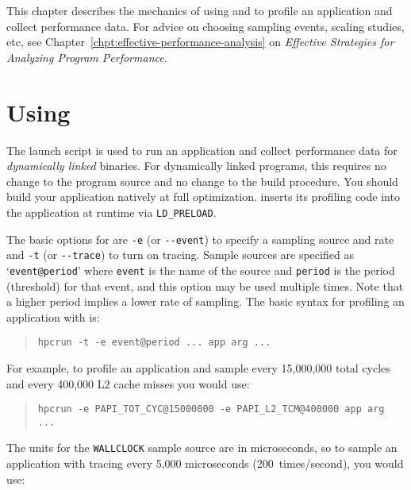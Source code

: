 
This chapter describes the mechanics of using \hpcrun{} and \hpclink{}
to profile an application and collect performance data.  For advice on
choosing sampling events, scaling studies, etc, see
Chapter~\ref{chpt:effective-performance-analysis} on {\it Effective
Strategies for Analyzing Program Performance}.

\section{Using \hpcrun{}}

The \hpcrun{} launch script is used to run an application and collect
performance data for {\it dynamically linked\/} binaries.  For
dynamically linked programs, this requires no change to the program
source and no change to the build procedure.  You should build your
application natively at full optimization.  \hpcrun{} inserts its
profiling code into the application at runtime via \verb|LD_PRELOAD|.

The basic options for \hpcrun{} are \verb|-e| (or \verb|--event|) to
specify a sampling source and rate and \verb|-t| (or \verb|--trace|) to
turn on tracing.  Sample sources are specified as `\verb|event@period|'
where \verb|event| is the name of the source and \verb|period| is the
period (threshold) for that event, and this option may be used
multiple times.  Note that a higher period implies a lower rate of
sampling.  The basic syntax for profiling an application with
\hpcrun{} is:

\begin{quote}
\begin{verbatim}
hpcrun -t -e event@period ... app arg ...
\end{verbatim}
\end{quote}

For example, to profile an application and sample every 15,000,000
total cycles and every 400,000 L2 cache misses you would use:

\begin{quote}
\begin{verbatim}
hpcrun -e PAPI_TOT_CYC@15000000 -e PAPI_L2_TCM@400000 app arg ...
\end{verbatim}
\end{quote}

The units for the \verb|WALLCLOCK| sample source are in microseconds,
so to sample an application with tracing every 5,000 microseconds
(200~times/second), you would use:

